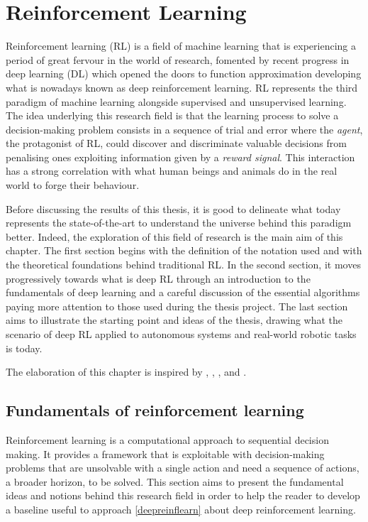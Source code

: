 \chapter{Reinforcement Learning} \label{ch:ch2}

Reinforcement learning (RL) is a field of machine learning that is experiencing a period of great fervour in the world of research, fomented by recent progress in deep learning (DL) which opened the doors to function approximation developing what is nowadays known as deep reinforcement learning.
RL represents the third paradigm of machine learning alongside supervised and unsupervised learning.
The idea underlying this research field is that the learning process to solve a decision-making problem consists in a sequence of trial and error where the \textit{agent}, the protagonist of RL, could discover and discriminate valuable decisions from penalising ones exploiting information given by a \textit{reward signal}.
This interaction has a strong correlation with what human beings and animals do in the real world to forge their behaviour.

Before discussing the results of this thesis, it is good to delineate what today represents the state-of-the-art to understand the universe behind this paradigm better.
Indeed, the exploration of this field of research is the main aim of this chapter.
The first section begins with the definition of the notation used and with the theoretical foundations behind traditional RL.
In the second section, it moves progressively towards what is deep RL through an introduction to the fundamentals of deep learning and a careful discussion of the essential algorithms paying more attention to those used during the thesis project.
The last section aims to illustrate the starting point and ideas of the thesis, drawing what the scenario of deep RL applied to autonomous systems and real-world robotic tasks is today.

The elaboration of this chapter is inspired by \cite{silver2015lectures}, \cite{sutton2018reinforcement}, \cite{openai2018spinningup}, \cite{lapan2018deep} and \cite{franccois2018introduction}.

\section{Fundamentals of reinforcement learning} \label{fundreinflearn}

Reinforcement learning is a computational approach to sequential decision making.
It provides a framework that is exploitable with decision-making problems that are unsolvable with a single action and need a sequence of actions, a broader horizon, to be solved.
This section aims to present the fundamental ideas and notions behind this research field in order to help the reader to develop a baseline useful to approach \vref{deepreinflearn} about deep reinforcement learning.

